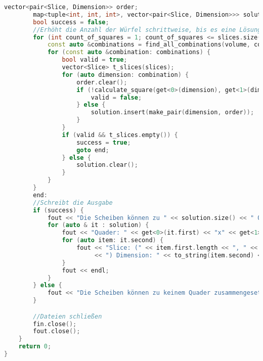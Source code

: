 \documentclass[a4paper,10pt,ngerman]{scrartcl}
\begin{document}
\begin{lstlisting}[frame=single,language=C++,title=Methode main,breaklines=true,label={lst:code_main_extended}]
        vector<pair<Slice, Dimension>> order;
        map<tuple<int, int, int>, vector<pair<Slice, Dimension>>> solution;
        bool success = false;
        //Erhöht die Anzahl der Würfel schrittweise, bis es eine Lösung gibt
        for (int count_of_squares = 1; count_of_squares <= slices.size(); count_of_squares++) {
            const auto &combinations = find_all_combinations(volume, count_of_squares, slices);
            for (const auto &combination: combinations) {
                bool valid = true;
                vector<Slice> t_slices(slices);
                for (auto dimension: combination) {
                    order.clear();
                    if (!calculate_square(get<0>(dimension), get<1>(dimension), get<2>(dimension), order, t_slices)) {
                        valid = false;
                    } else {
                        solution.insert(make_pair(dimension, order));
                    }
                }
                if (valid && t_slices.empty()) {
                    success = true;
                    goto end;
                } else {
                    solution.clear();
                }
            }
        }
        end:
        //Schreibt die Ausgabe
        if (success) {
            fout << "Die Scheiben können zu " << solution.size() << " Quader(n) zusammengesetzt werden." << endl;
            for (auto & it : solution) {
                fout << "Quader: " << get<0>(it.first) << "x" << get<1>(it.first) << "x" << get<2>(it.first) << endl;
                for (auto item: it.second) {
                    fout << "Slice: (" << item.first.length << ", " << item.first.height
                         << ") Dimension: " << to_string(item.second) << endl;
                }
                fout << endl;
            }
        } else {
            fout << "Die Scheiben können zu keinem Quader zusammengesetzt werden." << endl;
        }

        //Dateien schließen
        fin.close();
        fout.close();
    }
    return 0;
}
    \end{lstlisting}
\end{document}
